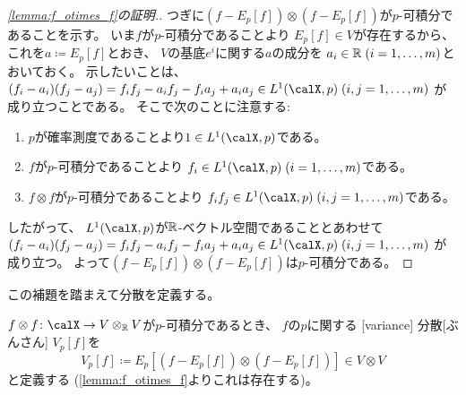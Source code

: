 \documentclass[report]{jlreq}
\begin{document}
\begin{proof}[\cref{lemma:f_otimes_f}の証明.]
    つぎに$(f - E_p[f]) \otimes (f - E_p[f])$が$p$-可積分であることを示す。
    いま$f$が$p$-可積分であることより
    $E_p[f] \in V$が存在するから、
    これを$a \coloneqq E_p[f]$とおき、
    $V$の基底$e^i$に関する$a$の成分を
    $a_i \in \mathbb{R} \; (i = 1, \dots, m)$とおいておく。
    示したいことは、
    $(f_i - a_i)(f_j - a_j)
        = f_i f_j - a_i f_j - f_i a_j + a_i a_j
        \in L^1(\calX, p) \; (i, j = 1, \dots, m)$
    が成り立つことである。
    そこで次のことに注意する:
    \begin{enumerate}[label=(\roman*)]
        \item $p$が確率測度であることより$1 \in L^1(\calX, p)$である。
        \item $f$が$p$-可積分であることより
            $f_i \in L^1(\calX, p) \; (i = 1, \dots, m)$である。
        \item $f \otimes f$が$p$-可積分であることより
            $f_i f_j
                \in L^1(\calX, p) \;
                (i, j = 1, \dots, m)$である。
    \end{enumerate}
    したがって、
    $L^1(\calX, p)$が$\mathbb{R}$-ベクトル空間であることとあわせて
    $(f_i - a_i)(f_j - a_j)
        = f_i f_j - a_i f_j - f_i a_j + a_i a_j
        \in L^1(\calX, p) \; (i, j = 1, \dots, m)$
    が成り立つ。
    よって$(f - E_p[f]) \otimes (f - E_p[f])$は$p$-可積分である。
\end{proof}

この補題を踏まえて分散を定義する。

\begin{definition}[分散]
    $f \otimes f \colon \calX \to V \otimes_\R V$が$p$-可積分であるとき、
    $f$の$p$に関する
    [variance]
        {分散}[ぶんさん]
    $V_p[f]$を
    \begin{equation}
        V_p[f]
            \coloneqq E_p[(f - E_p[f]) \otimes (f - E_p[f])]
            \in V \otimes V
    \end{equation}
    と定義する
    (\cref{lemma:f_otimes_f}よりこれは存在する)。
\end{definition}
\end{document}
